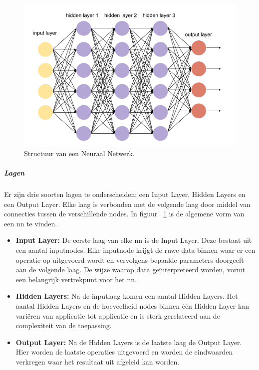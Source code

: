 		\begin{figure}
			\centering
			\includegraphics[width=140mm]{afbeeldingen/neuralNetwork3.PNG}
			\caption[Structuur van een Neuraal Netwerk.]{Structuur van een Neuraal Netwerk\cite{bron:machinelearningnetwork3}.}
			\label{fig:neuralNetworkStructuur}
		\end{figure}
		
			\subparagraph{Lagen}
			Er zijn drie soorten lagen te onderscheiden: een Input Layer, Hidden Layers en een Output Layer. Elke laag is verbonden met de volgende laag door middel van connecties tussen de verschillende nodes. In figuur ~\ref{fig:neuralNetworkStructuur} is de algemene vorm van een \gls{nn} te vinden.
		
				\begin{itemize}
					\item \textbf{Input Layer:} De eerste laag van elke \gls{nn} is de Input Layer. Deze bestaat uit een aantal inputnodes. Elke inputnode krijgt de ruwe data binnen waar er een operatie op uitgevoerd wordt en vervolgens bepaalde parameters doorgeeft aan de volgende laag. De wijze waarop data ge\"interpreteerd worden, vormt een belangrijk vertrekpunt voor het \gls{nn}.
					\item \textbf{Hidden Layers:}  Na de inputlaag komen een aantal Hidden Layers. Het aantal Hidden Layers en de hoeveelheid nodes binnen \'e\'en Hidden Layer kan vari\"eren van applicatie tot applicatie en is sterk gerelateerd aan de complexiteit van de toepassing.
					\item \textbf{Output Layer:} Na de Hidden Layers is de laatste laag de Output Layer. Hier worden de laatste operaties uitgevoerd en worden de eindwaarden verkregen waar het resultaat uit afgeleid kan worden.
				\end{itemize}
			
